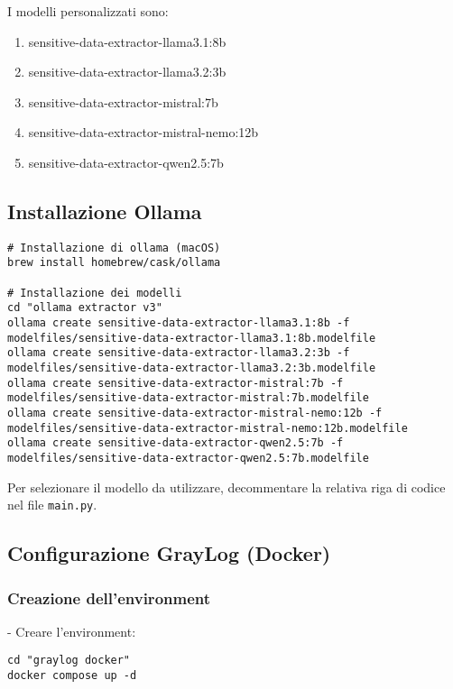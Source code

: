 \documentclass[12pt]{report}
\begin{document}
I modelli personalizzati sono:
\begin{enumerate}
    \item sensitive-data-extractor-llama3.1:8b
    \item sensitive-data-extractor-llama3.2:3b
    \item sensitive-data-extractor-mistral:7b
    \item sensitive-data-extractor-mistral-nemo:12b
    \item sensitive-data-extractor-qwen2.5:7b
\end{enumerate}

\subsection*{Installazione Ollama}
\label{subsec:installazione_ollama_v3}

\begin{verbatim}
# Installazione di ollama (macOS)
brew install homebrew/cask/ollama

# Installazione dei modelli
cd "ollama extractor v3"
ollama create sensitive-data-extractor-llama3.1:8b -f modelfiles/sensitive-data-extractor-llama3.1:8b.modelfile
ollama create sensitive-data-extractor-llama3.2:3b -f modelfiles/sensitive-data-extractor-llama3.2:3b.modelfile
ollama create sensitive-data-extractor-mistral:7b -f modelfiles/sensitive-data-extractor-mistral:7b.modelfile
ollama create sensitive-data-extractor-mistral-nemo:12b -f modelfiles/sensitive-data-extractor-mistral-nemo:12b.modelfile
ollama create sensitive-data-extractor-qwen2.5:7b -f modelfiles/sensitive-data-extractor-qwen2.5:7b.modelfile
\end{verbatim}

Per selezionare il modello da utilizzare, decommentare la relativa riga di codice nel file \texttt{main.py}.

\subsection*{Configurazione GrayLog (Docker)}
\label{subsec:configurazione_graylog}

\subsubsection*{Creazione dell'environment}
\label{subsubsec:creazione_environment}

- Creare l'environment:
\begin{verbatim}
cd "graylog docker"
docker compose up -d
\end{verbatim}
\end{document}
